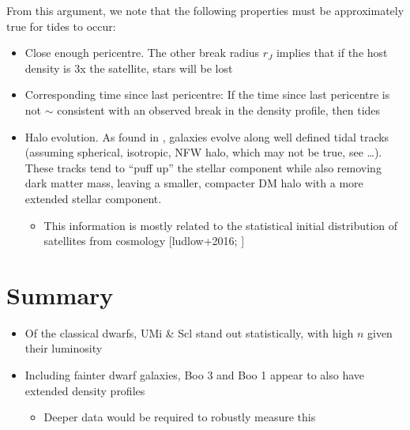 From this argument, we note that the following properties must be
approximately true for tides to occur:

\begin{itemize}
\tightlist
\item
  Close enough pericentre. The other break radius \(r_J\) implies that
  if the host density is 3x the satellite, stars will be lost
\item
  Corresponding time since last pericentre: If the time since last
  pericentre is not \(\sim\) consistent with an observed break in the
  density profile, then tides
\item
  Halo evolution. As found in \citet{EN2021}, galaxies evolve along well
  defined tidal tracks (assuming spherical, isotropic, NFW halo, which
  may not be true, see \ldots). These tracks tend to ``puff up'' the
  stellar component while also removing dark matter mass, leaving a
  smaller, compacter DM halo with a more extended stellar component.

  \begin{itemize}
  \tightlist
  \item
    This information is mostly related to the statistical initial
    distribution of satellites from cosmology {[}ludlow+2016;
    \citet{fattahi+2018}{]}
  \end{itemize}
\end{itemize}

\section{Summary}\label{summary}

\begin{itemize}
\tightlist
\item
  Of the classical dwarfs, UMi \& Scl stand out statistically, with high
  \(n\) given their luminosity
\item
  Including fainter dwarf galaxies, Boo 3 and Boo 1 appear to also have
  extended density profiles

  \begin{itemize}
  \tightlist
  \item
    Deeper data would be required to robustly measure this
  \end{itemize}
\end{itemize}
